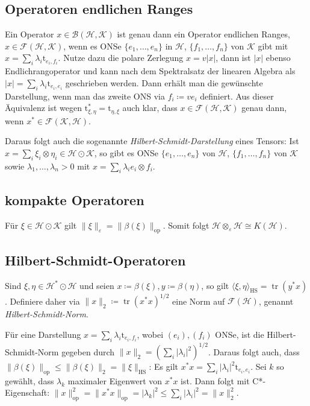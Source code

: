 \documentclass[11pt,a4paper]{scrartcl}
\newcommand{\Hc}{\mathcal{H}}
\newcommand{\Kc}{\mathcal{K}}
\newcommand{\B}{\mathcal{B}}
\newcommand{\F}{\mathcal{F}}
\theoremstyle{plain}
\theoremstyle{definition}
\theoremstyle{remark}
\DeclareMathOperator{\tr}{tr}
\begin{document}
\subsection{Operatoren endlichen Ranges}

Ein Operator $x\in \B(\Hc,\Kc)$ ist genau dann ein Operator endlichen Ranges, $x\in \F(\Hc,\Kc)$, wenn es ONSe $\{e_1,\dots,e_n\}$ in $\Hc$, $\{f_1,\dots,f_n\}$ von $\Kc$ gibt mit $x=\sum_i \lambda_i \mathrm{t}_{e_i,f_i}$. Nutze dazu die polare Zerlegung $x=v|x|$, dann ist $|x|$ ebenso Endlichrangoperator und kann nach dem Spektralsatz der linearen Algebra als $|x|=\sum_i \lambda_i \mathrm{t}_{e_i,e_i}$ geschrieben werden. Dann erhält man die gewünschte Darstellung, wenn man das zweite ONS via $f_i\coloneqq ve_i$ definiert. Aus dieser Äquivalenz ist wegen $\mathrm{t}_{\xi,\eta}^*=\mathrm{t}_{\eta,\xi}$ auch klar, dass $x\in\F(\Hc,\Kc)$ genau dann, wenn $x^*\in\F(\Kc,\Hc)$.

Daraus folgt auch die sogenannte \emph{Hilbert-Schmidt-Darstellung} eines Tensors: Ist $x=\sum_i \xi_i\otimes \eta_i \in \Hc\odot \Kc$, so gibt es ONSe $\{e_1,\dots,e_n\}$ von $\Hc$, $\{f_1,\dots,f_n\}$ von $\Kc$ sowie $\lambda_1,\dots,\lambda_n > 0$ mit $x=\sum_i \lambda_i e_i\otimes f_i$.

\subsection{kompakte Operatoren}

Für $\xi\in \Hc\odot \Kc$ gilt $\|\xi\|_\varepsilon = \|\beta(\xi)\|_\mathrm{op}$. Somit folgt $\Hc \otimes_\varepsilon \Hc \cong K(\Hc)$.

\subsection{Hilbert-Schmidt-Operatoren}

Sind $\xi,\eta\in \Hc^*\odot \Hc$ und seien $x\coloneqq \beta(\xi), y\coloneqq \beta(\eta)$, so gilt $\langle \xi, \eta \rangle_\mathrm{HS} = \tr(y^*x)$. Definiere daher via $\|x\|_2 \coloneqq \tr(x^*x)^{1/2}$ eine Norm auf $\F(\Hc)$, genannt \emph{Hilbert-Schmidt-Norm}. 

Für eine Darstellung $x=\sum_i \lambda_i \mathrm{t}_{e_i,f_i}$, wobei $(e_i),(f_i)$ ONSe, ist die Hilbert-Schmidt-Norm gegeben durch $\|x\|_2 = \left(\sum_i |\lambda_i|^2\right)^{1/2}$. Daraus folgt auch, dass $\|\beta(\xi)\|_\mathrm{op}\leq \|\beta(\xi)\|_2=\|\xi\|_\mathrm{HS}$: Es gilt $x^*x=\sum_i |\lambda_i|^2 \mathrm{t}_{e_i,e_i}$. Sei $k$ so gewählt, dass $\lambda_k$ maximaler Eigenwert von $x^*x$ ist. Dann folgt mit C*-Eigenschaft: $\|x\|_\mathrm{op}^2=\|x^*x\|_\mathrm{op} = |\lambda_k|^2 \leq \sum_i |\lambda_i|^2 = \|x\|_2^2$.
\end{document}
